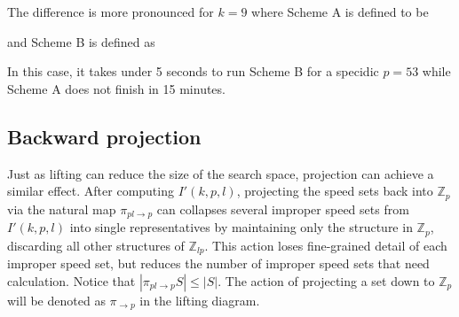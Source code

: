 \documentclass[11pt]{amsart}
\newcommand{\abs}[1]{\left|#1\right|}
\newcommand{\Int}[1]{\mathbb Z_{#1}}
\theoremstyle{definition}
\theoremstyle{remark}
\begin{document}
The difference is more pronounced for $k=9$ where Scheme A is defined to be 
\begin{center}
\end{center}
and Scheme B is defined as
\begin{center}
\end{center}
In this case, it takes under 5 seconds to run Scheme B for a specidic $p=53$ while Scheme A does not finish in 15 minutes.

\subsection{Backward projection}

Just as lifting can reduce the size of the search space, projection can achieve a similar effect.
After computing $I'(k, p, l)$, projecting the speed sets back into $\Int{p}$ via the natural map $\pi_{pl \to p}$
can collapses several improper speed sets from $I'(k, p, l)$ into single representatives by maintaining only the structure 
in $\Int{p}$, discarding all other structures of $\Int{lp}$.
This action loses fine-grained detail of each improper speed set, but reduces the number of improper speed sets that need calculation.
Notice that $\abs{\pi_{pl \to p} S} \le \abs{S}$. The action of projecting a set down to $\Int{p}$ will be denoted 
as $\pi_{\to p}$ in the lifting diagram. 
\end{document}
